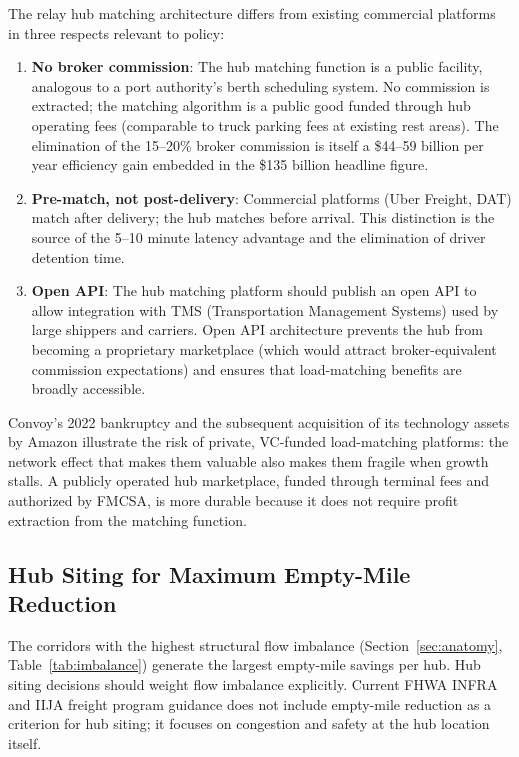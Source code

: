 The relay hub matching architecture differs from existing commercial platforms in three respects relevant to policy:

\begin{enumerate}
  \item \textbf{No broker commission}: The hub matching function is a public facility, analogous to a port authority's berth scheduling system. No commission is extracted; the matching algorithm is a public good funded through hub operating fees (comparable to truck parking fees at existing rest areas). The elimination of the 15--20\% broker commission is itself a \$44--59 billion per year efficiency gain embedded in the \$135 billion headline figure.

  \item \textbf{Pre-match, not post-delivery}: Commercial platforms (Uber Freight, DAT) match after delivery; the hub matches before arrival. This distinction is the source of the 5--10 minute latency advantage and the elimination of driver detention time.

  \item \textbf{Open API}: The hub matching platform should publish an open API to allow integration with TMS (Transportation Management Systems) used by large shippers and carriers. Open API architecture prevents the hub from becoming a proprietary marketplace (which would attract broker-equivalent commission expectations) and ensures that load-matching benefits are broadly accessible.
\end{enumerate}

Convoy's 2022 bankruptcy and the subsequent acquisition of its technology assets by Amazon illustrate the risk of private, VC-funded load-matching platforms: the network effect that makes them valuable also makes them fragile when growth stalls. A publicly operated hub marketplace, funded through terminal fees and authorized by FMCSA, is more durable because it does not require profit extraction from the matching function.

\subsection{Hub Siting for Maximum Empty-Mile Reduction}

The corridors with the highest structural flow imbalance (Section~\ref{sec:anatomy}, Table~\ref{tab:imbalance}) generate the largest empty-mile savings per hub. Hub siting decisions should weight flow imbalance explicitly. Current FHWA INFRA and IIJA freight program guidance does not include empty-mile reduction as a criterion for hub siting; it focuses on congestion and safety at the hub location itself.

